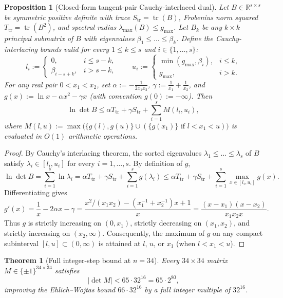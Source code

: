 \documentclass[11pt]{article}
\newtheorem{theorem}{Theorem}
\newtheorem{proposition}{Proposition}
\theoremstyle{remark}
\newcommand{\R}{\mathbb{R}}
\newcommand{\tr}{\operatorname{tr}}
\begin{document}
\begin{proposition}[Closed-form tangent-pair Cauchy-interlaced dual]\label{prop:tangent_dual}
Let $B \in \R^{s \times s}$ be symmetric positive definite with trace $S_{\tr} = \tr(B)$, Frobenius norm squared $T_{\tr} = \tr(B^2)$, and spectral radius $\lambda_{\max}(B) \le g_{\max}$. Let $B_k$ be any $k \times k$ principal submatrix of $B$ with eigenvalues $\beta_1 \le \dots \le \beta_k$. Define the Cauchy-interlacing bounds valid for every $1 \le k \le s$ and $i \in \{1, \dots, s\}$:
\[
  l_i := \begin{cases} 0, & i \le s - k, \\ \beta_{i - s + k}, & i > s - k, \end{cases}
  \qquad
  u_i := \begin{cases} \min(g_{\max}, \beta_i), & i \le k, \\ g_{\max}, & i > k. \end{cases}
\]
For any real pair $0 < x_1 < x_2$, set $\alpha := -\frac{1}{2 x_1 x_2}$, $\gamma := \frac{1}{x_1} + \frac{1}{x_2}$, and $g(x) := \ln x - \alpha x^2 - \gamma x$ (with convention $g(0) := -\infty$). Then
\begin{equation}\label{eq:tangent_dual}
  \ln \det B \le \alpha T_{\tr} + \gamma S_{\tr} + \sum_{i=1}^s M(l_i, u_i),
\end{equation}
where $M(l, u) := \max\bigl(\{g(l), g(u)\} \cup (\{g(x_1)\} \text{ if } l < x_1 < u)\bigr)$ is evaluated in $O(1)$ arithmetic operations.
\end{proposition}

\begin{proof}
By Cauchy's interlacing theorem, the sorted eigenvalues $\lambda_1 \le \dots \le \lambda_s$ of $B$ satisfy $\lambda_i \in [l_i, u_i]$ for every $i = 1, \dots, s$. By definition of $g$,
\[
  \ln \det B = \sum_{i=1}^s \ln \lambda_i = \alpha T_{\tr} + \gamma S_{\tr} + \sum_{i=1}^s g(\lambda_i) \le \alpha T_{\tr} + \gamma S_{\tr} + \sum_{i=1}^s \max_{x \in [l_i, u_i]} g(x).
\]
Differentiating gives
\[
  g'(x) = \frac{1}{x} - 2\alpha x - \gamma = \frac{x^2 / (x_1 x_2) - (x_1^{-1} + x_2^{-1}) x + 1}{x} = \frac{(x - x_1)(x - x_2)}{x_1 x_2 x}.
\]
Thus $g$ is strictly increasing on $(0, x_1)$, strictly decreasing on $(x_1, x_2)$, and strictly increasing on $(x_2, \infty)$. Consequently, the maximum of $g$ on any compact subinterval $[l, u] \subset (0, \infty)$ is attained at $l$, $u$, or $x_1$ (when $l < x_1 < u$).
\end{proof}

\begin{theorem}[Full integer-step bound at $n = 34$]\label{thm:d34}
Every $34 \times 34$ matrix $M \in \{\pm 1\}^{34 \times 34}$ satisfies
\[
  |\det M| < 65 \cdot 32^{16} = 65 \cdot 2^{80},
\]
improving the Ehlich--Wojtas bound $66 \cdot 32^{16}$ by a full integer multiple of $32^{16}$.
\end{theorem}
\end{document}
